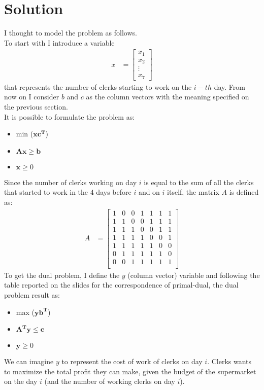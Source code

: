 \documentclass[1pt]{article}
\begin{document}
	\section{Solution}
		I thought to model the problem as follows.\\
		To start with I introduce a variable 
		\begin{align}
		x &= \begin{bmatrix}
           x_{1} \\
           x_{2} \\
           \vdots \\
           x_{7}
         \end{bmatrix}
		\end{align}
		that represents the number of clerks starting to work on the $i-th$ day. From now on I consider $b$ and $c$ as the column vectors with the meaning specified on the previous section.\\
		It is possible to formulate the problem as:
		\begin{itemize}
			\item min ($\boldsymbol{x}\boldsymbol{c^T}$)
			\item $\boldsymbol{Ax} \geqslant \boldsymbol{b}$
			\item $\boldsymbol{x} \geqslant 0$
		\end{itemize}
		Since the number of clerks working on day $i$ is equal to the sum of all the clerks that started to work in the 4 days before $i$ and on $i$ itself, the matrix $A$ is defined as:
		\begin{align}
		A &= \begin{bmatrix}
				1 & 0 & 0 & 1 & 1 & 1 & 1 \\
				1 & 1 & 0 & 0 & 1 & 1 & 1 \\
				1 & 1 & 1 & 0 & 0 & 1 & 1 \\
				1 & 1 & 1 & 1 & 0 & 0 & 1 \\
				1 & 1 & 1 & 1 & 1 & 0 & 0 \\
				0 & 1 & 1 & 1 & 1 & 1 & 0 \\
				0 & 0 & 1 & 1 & 1 & 1 & 1 \\
             \end{bmatrix}
		\end{align}
		\newpage
		To get the dual problem, I define the $y$ (column vector) variable and following the table reported on the slides for the correspondence of primal-dual, the dual problem result as:
		\begin{itemize}
			\item max ($\boldsymbol{yb^T}$)
			\item $\boldsymbol{A^Ty} \leqslant \boldsymbol{c}$
			\item $\boldsymbol{y} \geqslant 0$
		\end{itemize}
		We can imagine $y$ to represent the cost of work of clerks on day $i$. Clerks wants to maximize the total profit they can make, given the budget of the supermarket on the day $i$ (and the number of working clerks on day $i$).
\end{document}
